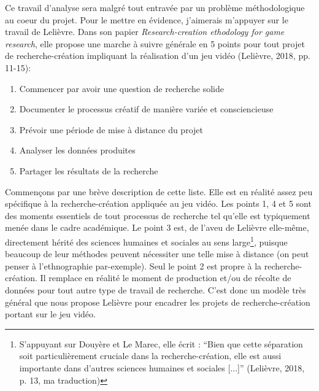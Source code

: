 \documentclass{scrartcl}
\begin{document}
	Ce travail d'analyse sera malgré tout entravée par un problème méthodologique au coeur du projet. Pour le mettre en évidence, j'aimerais m'appuyer sur le travail de Lelièvre. Dans son papier \textit{Research-creation ethodology for game research}, elle propose une marche à suivre générale en 5 points pour tout projet de recherche-création impliquant la réalisation d'un jeu vidéo (Lelièvre, 2018, pp. 11-15): \\
	\begin{enumerate}
		\item Commencer par avoir une question de recherche solide
		\item Documenter le processus créatif de manière variée et consciencieuse
		\item Prévoir une période de mise à distance du projet
		\item Analyser les données produites
		\item Partager les résultats de la recherche\\
	\end{enumerate}
	Commençons par une brève description de cette liste. Elle est en réalité assez peu spécifique à la recherche-création appliquée au jeu vidéo. Les points 1, 4 et 5 sont des moments essentiels de tout processus de recherche tel qu'elle est typiquement menée dans le cadre académique. Le point 3 est, de l'aveu de Lelièvre elle-même, directement hérité des sciences humaines et sociales au sens large\footnote{S'appuyant sur Douyère et Le Marec, elle écrit : “Bien que cette séparation soit particulièrement cruciale dans la recherche-création, elle est aussi importante dans d'autres sciences humaines et sociales [...]” (Lelièvre, 2018, p. 13, ma traduction)}, puisque beaucoup de leur méthodes peuvent nécessiter une telle mise à distance (on peut penser à l'ethnographie par-exemple). Seul le point 2 est propre à la recherche-création. Il remplace en réalité le moment de production et/ou de récolte de données pour tout autre type de travail de recherche. C'est donc un modèle très général que nous propose Lelièvre pour encadrer les projets de recherche-création portant sur le jeu vidéo.\\
\end{document}

